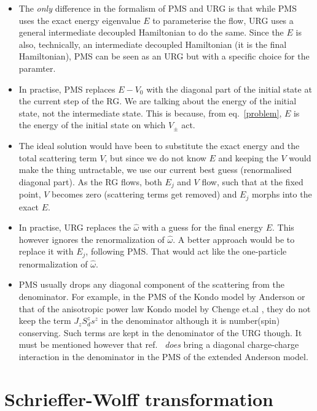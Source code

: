 \documentclass[twoside]{report}
\numberwithin{equation}{section}
\begin{document}
\begin{itemize}
\item The \textit{only} difference in the formalism of PMS and URG is that while PMS uses the exact energy eigenvalue \(E\) to parameterise the flow, URG uses a general intermediate decoupled Hamiltonian to do the same. Since the \(E\) is also, technically, an intermediate decoupled Hamiltonian (it is the final Hamiltonian), PMS can be seen as an URG but with a specific choice for the paramter.
\item In practise, PMS replaces \(E-V_0\) with the diagonal part of the initial state at the current step of the RG. We are talking about the energy of the initial state, not the intermediate state. This is because, from eq.~\ref{problem}, \(E\) is the energy of the initial state on which \(V_\pm\) act. 
\item The ideal solution would have been to substitute the exact energy and the total scattering term \(V\), but since we do not know \(E\) and keeping the \(V\) would make the thing untractable, we use our current best guess (renormalised diagonal part). As the RG flows, both \(E_j\) and \(V\) flow, such that at the fixed point, \(V\) becomes zero (scattering terms get removed) and \(E_j\) morphs into the exact \(E\). 
\item In practise, URG replaces the \(\hat \omega\) with a guess for the final energy \(E\). This however ignores the renormalization of \(\hat \omega\). A better approach would be to replace it with \(E_j\), following PMS. That would act like the one-particle renormalization of \(\hat \omega\).
\item PMS usually drops any diagonal component of the scattering from the denominator. For example, in the PMS of the Kondo model by Anderson \cite{Anderson} or that of the anisotropic power law Kondo model by Chenge et.al \cite{tatha}, they do not keep the term \(J_z S_d^z s^z\) in the denominator although it is number(spin) conserving. Such terms are kept in the denominator of the URG though. It must be mentioned however that ref.~\cite{raja} \textit{does} bring a diagonal charge-charge interaction in the denominator in the PMS of the extended Anderson model.
\end{itemize}
\section{Schrieffer-Wolff transformation}
\end{document}
